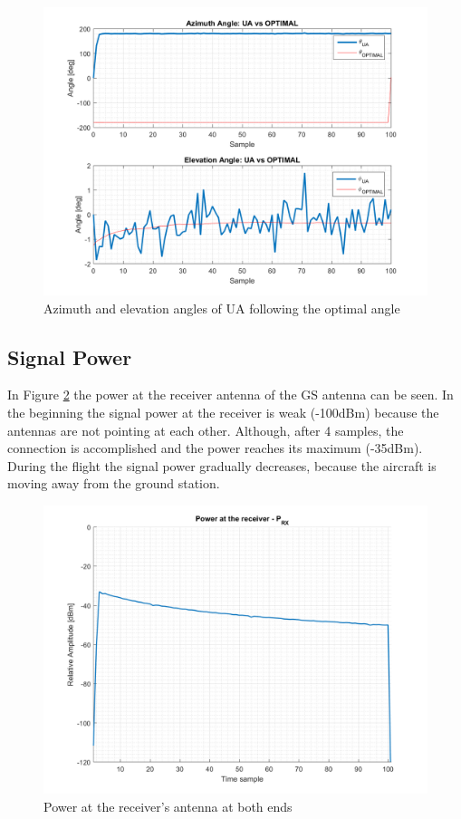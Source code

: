\begin{figure}[H]
	\centering
	\includegraphics[scale=0.8]{figures/s2_ua.png}
	\caption{Azimuth and elevation angles of UA following the optimal angle}
	\label{fig:s2_ua}
\end{figure}


\subsection*{Signal Power}
In Figure \ref{fig:s2_power} the power at the receiver antenna of the GS antenna can be seen. In the beginning the signal power at the receiver is weak (-100dBm) because the antennas are not pointing at each other. Although, after 4 samples, the connection is accomplished and the power reaches its maximum (-35dBm). During the flight the signal power gradually decreases, because the aircraft is moving away from the ground station. 

\begin{figure}[H]
	\centering
	\includegraphics[scale=0.8]{figures/s2_power.png}
	\caption{Power at the receiver's antenna at both ends}
	\label{fig:s2_power}
\end{figure}


